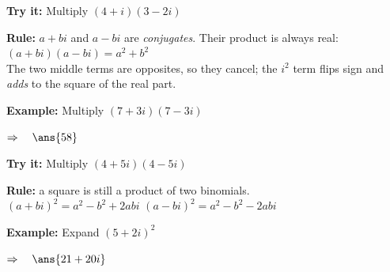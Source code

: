 \documentclass[12pt]{article}
\begin{document}
\begin{tryitbox}
\textbf{Try it:} \quad Multiply $(4 + i)(3 - 2i)$\\[2pt]
\end{tryitbox}


\begin{formulabox}
\textbf{Rule:} $a + bi$ and $a - bi$ are \textit{conjugates}. Their product is
always real:\\[3pt]
$(a + bi)(a - bi) = a^2 + b^2$\\[3pt]
The two middle terms are opposites, so they cancel; the $i^2$ term flips sign
and \textit{adds} to the square of the real part.
\end{formulabox}

\begin{examplebox}
\textbf{Example:} \quad Multiply $(7 + 3i)(7 - 3i)$

$\Rightarrow\quad \ans{58}$
\end{examplebox}

\begin{tryitbox}
\textbf{Try it:} \quad Multiply $(4 + 5i)(4 - 5i)$\\[2pt]
\end{tryitbox}


\begin{formulabox}
\textbf{Rule:} a square is still a product of two binomials.\\[3pt]
$(a + bi)^2 = a^2 - b^2 + 2abi$ \qquad $(a - bi)^2 = a^2 - b^2 - 2abi$
\end{formulabox}

\begin{examplebox}
\textbf{Example:} \quad Expand $(5 + 2i)^2$

$\Rightarrow\quad \ans{21 + 20i}$
\end{examplebox}
\end{document}
